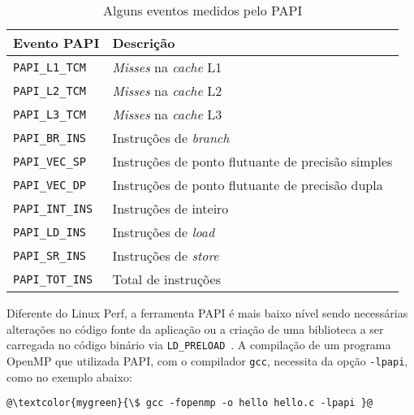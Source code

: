 \begin{table}[!htb]
    \centering
    \caption{Alguns eventos medidos pelo PAPI}
    \label{tab:papi:events}
    \begin{tabular}{ll}
        \toprule
        Evento PAPI     & Descrição                 \\ \midrule

        \texttt{PAPI\_L1\_TCM}  & \textit{Misses} na \textit{cache} L1      \\
        \texttt{PAPI\_L2\_TCM}  & \textit{Misses} na \textit{cache} L2      \\
        \texttt{PAPI\_L3\_TCM}  & \textit{Misses} na \textit{cache} L3      \\
        \midrule
        \texttt{PAPI\_BR\_INS}  & Instruções de \textit{branch}       \\
        \texttt{PAPI\_VEC\_SP}  & Instruções de ponto flutuante de precisão simples \\
        \texttt{PAPI\_VEC\_DP}  & Instruções de ponto flutuante de precisão dupla \\
        \texttt{PAPI\_INT\_INS} & Instruções de inteiro        \\
        \texttt{PAPI\_LD\_INS}  & Instruções de \textit{load}           \\
        \texttt{PAPI\_SR\_INS}  & Instruções de \textit{store}          \\
        \texttt{PAPI\_TOT\_INS} & Total de instruções      \\ \bottomrule
    \end{tabular}
\end{table}

Diferente do Linux Perf, a ferramenta PAPI é mais baixo nível sendo necessárias alterações no código fonte da aplicação ou a criação de uma biblioteca a ser carregada no código binário via \texttt{LD\_PRELOAD}~\cite{pulo2009fun, cieslak2015dynamic}. A compilação de um programa OpenMP que utilizada PAPI, com o compilador \texttt{gcc}, necessita da opção \texttt{-lpapi}, como no exemplo abaixo:

\begin{lstlisting}[frame=none, numbers=none]
@\textcolor{mygreen}{\$ gcc -fopenmp -o hello hello.c -lpapi }@
\end{lstlisting}

